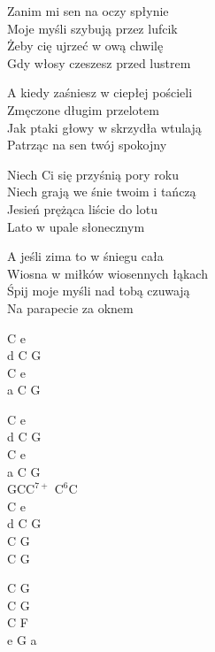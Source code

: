 
\begin{textn}
    Zanim mi sen na oczy spłynie\\
    Moje myśli szybują przez lufcik\\
    Żeby cię ujrzeć w ową chwilę\\
    Gdy włosy czeszesz przed lustrem

    A kiedy zaśniesz w ciepłej pościeli\\
    Zmęczone długim przelotem\\
    Jak ptaki głowy w skrzydła wtulają\\
    Patrząc na sen twój spokojny

    Niech Ci się przyśnią pory roku\\
    Niech grają we śnie twoim i tańczą\\
    Jesień prężąca liście do lotu\\
    Lato w upale słonecznym

    A jeśli zima to w śniegu cała\\
    Wiosna w miłków wiosennych łąkach\\
    Śpij moje myśli nad tobą czuwają\\
    Na parapecie za oknem
\end{textn}
\begin{chordw}
    C e\\
    d C G\\
    C e\\
    a C G

    C e\\
    d C G\\
    C e\\
    a C G\\
    GC$\mathrm{C^{7+}}$ $\mathrm{C^{6}}$C\\
    C e\\
    d C G\\
    C G\\
    C G

    C G\\
    C G\\
    C F\\
    e G a
\end{chordw}
